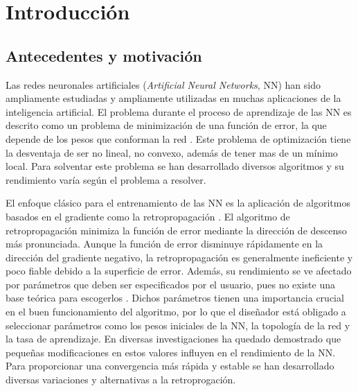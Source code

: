\chapter{Introducción}
\section{Antecedentes y motivación}
Las redes neuronales artificiales ({\em Artificial Neural Networks}, NN) han sido ampliamente estudiadas y ampliamente utilizadas en muchas aplicaciones de la inteligencia artificial. El problema durante el proceso de aprendizaje de las NN es descrito como un problema de minimización de una función de error, la que depende de los pesos que conforman la red \cite{Rumelhart1986}. Este problema de optimización tiene la desventaja de ser no lineal, no convexo, además de tener mas de un mínimo local. Para solventar este problema se han desarrollado diversos algoritmos \cite{Grippo1994,Jacobs1988,Plagianakos2002,Rumelhart1986b,Plagianakos1998}  y su rendimiento varía según el problema a resolver.

El enfoque clásico para el entrenamiento de las NN es la aplicación de algoritmos basados en el gradiente como la retropropagación \cite{Rumelhart1986b}. El algoritmo de retropropagación minimiza la función de error mediante la dirección de descenso más pronunciada. Aunque la función de error disminuye rápidamente en la dirección del gradiente negativo, la retropropagación es generalmente ineficiente y poco fiable \cite{Gori1992} debido a la superficie de error. Además, su rendimiento se ve afectado por parámetros que deben ser especificados por el usuario, pues no existe una base teórica para escogerlos \cite{Nguyen1990}. Dichos parámetros tienen una importancia crucial en el buen funcionamiento del algoritmo, por lo que el diseñador está obligado a seleccionar parámetros como los pesos iniciales de la NN, la topología de la red y la tasa de aprendizaje. En diversas investigaciones \cite{Cauchy1847, Grippo1994, Plagianakos1998, Plagianakos2002} ha quedado demostrado que pequeñas modificaciones en estos valores influyen en el rendimiento de la NN. Para proporcionar una convergencia más rápida y estable se han desarrollado diversas variaciones y alternativas a la retroprogación.

